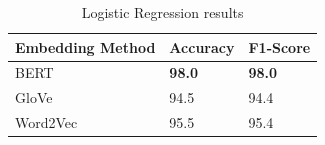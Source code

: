 \begin{table}[hbt!]
\begin{threeparttable}
\caption{Logistic Regression results}
\label{lr_results}
\begin{tabular}{lll}
\toprule
\headrow Embedding Method & Accuracy & F1-Score\\
\midrule
BERT & \textbf{98.0} & \textbf{98.0} \\ 
GloVe & 94.5 & 94.4 \\ 
Word2Vec & 95.5 & 95.4 \\ 
\bottomrule
\end{tabular}
\end{threeparttable}
\end{table}